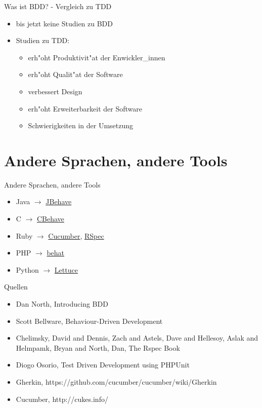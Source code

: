 \documentclass{beamer}
\begin{document}
  \begin{frame}{Was ist BDD? - Vergleich zu TDD}
    \begin{itemize}
      \item bis jetzt keine Studien zu BDD
      \item Studien zu TDD:
      \begin{itemize}
        \item erh"oht Produktivit"at der Enwickler\_innen
        \item erh"oht Qualit"at der Software
        \item verbessert Design
        \item erh"oht Erweiterbarkeit der Software
        \item Schwierigkeiten in der Umsetzung
      \end{itemize}
    \end{itemize}
  \end{frame}

\section{Andere Sprachen, andere Tools}
  
  \begin{frame}{Andere Sprachen, andere Tools}
    \begin{itemize}
      \item Java \( \rightarrow \) \href{http://jbehave.org/}{JBehave}
      \item C \( \rightarrow \) \href{http://code.google.com/p/cbehave/}{CBehave}
      \item Ruby \( \rightarrow \) \href{http://cukes.info}{Cucumber}, \href{http://rspec.info}{RSpec}
      \item PHP \( \rightarrow \) \href{http://behat.org}{behat}
      \item Python \( \rightarrow \) \href{http://lettuce.it}{Lettuce}
    \end{itemize}
  \end{frame}

  \begin{frame}{Quellen}
    \begin{itemize}
      \item Dan North, Introducing BDD
      \item Scott Bellware, Behaviour-Driven Development
      \item Chelimsky, David and Dennis, Zach and Astels, Dave and Hellesoy, Aslak and Helmpamk, Bryan and North, Dan, The Rspec Book
      \item Diogo Osorio, Test Driven Development using PHPUnit
      \item Gherkin, https://github.com/cucumber/cucumber/wiki/Gherkin
      \item Cucumber, http://cukes.info/
    \end{itemize}
  \end{frame}
\end{document}
